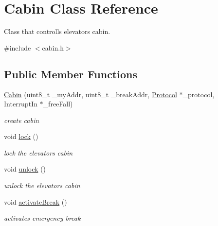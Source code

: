 \hypertarget{classCabin}{}\section{Cabin Class Reference}
\label{classCabin}


Class that controlls elevator\textquotesingle{}s cabin.  




{\ttfamily \#include $<$cabin.\+h$>$}

\subsection*{Public Member Functions}
\begin{DoxyCompactItemize}
\item 
\hyperlink{classCabin_ad1fcd1dd96414aa2c529bd13156d37b3}{Cabin} (uint8\+\_\+t \+\_\+my\+Addr, uint8\+\_\+t \+\_\+break\+Addr, \hyperlink{classProtocol}{Protocol} $\ast$\+\_\+protocol, Interrupt\+In $\ast$\+\_\+free\+Fall)
\begin{DoxyCompactList}\small\item\em create cabin \end{DoxyCompactList}\item 
\mbox{\label{classCabin_a4b87c8a9a550603cdbb252293f2d7ace}} 
void \hyperlink{classCabin_a4b87c8a9a550603cdbb252293f2d7ace}{lock} ()
\begin{DoxyCompactList}\small\item\em lock the elevator\textquotesingle{}s cabin \end{DoxyCompactList}\item 
\mbox{\label{classCabin_ae0465f78000ebd3c4d63891f132f8ed7}} 
void \hyperlink{classCabin_ae0465f78000ebd3c4d63891f132f8ed7}{unlock} ()
\begin{DoxyCompactList}\small\item\em unlock the elevator\textquotesingle{}s cabin \end{DoxyCompactList}\item 
\mbox{\label{classCabin_a3e51b91e0c52f4c1bfc084eae51b078e}} 
void \hyperlink{classCabin_a3e51b91e0c52f4c1bfc084eae51b078e}{activate\+Break} ()
\begin{DoxyCompactList}\small\item\em activates emergency break \end{DoxyCompactList}\item 

\end{DoxyCompactItemize}
